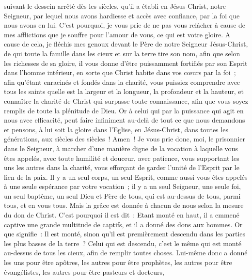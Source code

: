\begin{multicols}{2}
suivant le dessein arrêté dès les siècles, qu'il a établi en Jésus-Christ, notre Seigneur,
par lequel nous avons hardiesse et accès avec confiance, par la foi que nous avons en lui.
C'est pourquoi, je vous prie de ne pas vous relâcher à cause de mes afflictions que je souffre pour l'amour de vous, ce qui est votre gloire.
A cause de cela, je fléchis mes genoux devant le Père de notre Seigneur Jésus-Christ,
de qui toute la famille dans les cieux et sur la terre tire son nom,
afin que selon les richesses de sa gloire, il vous donne d'être puissamment fortifiés par son Esprit dans l'homme intérieur,
en sorte que Christ habite dans vos cœurs par la foi~; afin qu'étant enracinés et fondés dans la charité,
vous puissiez comprendre avec tous les saints quelle est la largeur et la longueur, la profondeur et la hauteur,
et connaître la charité de Christ qui surpasse toute connaissance, afin que vous soyez remplis de toute la plénitude de Dieu.
Or à celui qui par la puissance qui agit en nous avec efficacité, peut faire infiniment au-delà de tout ce que nous demandons et pensons,
à lui soit la gloire dans l'Eglise, en Jésus-Christ, dans toutes les générations, aux siècles des siècles~! Amen~!
\VerseOne{}Je vous prie donc, moi, le prisonnier dans le Seigneur, à marcher d'une manière digne de la vocation à laquelle vous êtes appelés,
avec toute humilité et douceur, avec patience, vous supportant les uns les autres dans la charité,
vous efforçant de garder l'unité de l'Esprit par le lien de la paix.
Il y a un seul corps, un seul Esprit, comme aussi vous êtes appelés à une seule espérance par votre vocation~;
il y a un seul Seigneur, une seule foi, un seul baptême,
un seul Dieu et Père de tous, qui est au-dessus de tous, parmi tous, et en vous tous.
Mais la grâce est donnée à chacun de nous selon la mesure du don de Christ.
C'est pourquoi il est dit~: Etant monté en haut, il a emmené captive une grande multitude de captifs, et il a donné des dons aux hommes.
Or que signifie~: Il est monté, sinon qu'il est premièrement descendu dans les parties les plus basses de la terre~?
Celui qui est descendu, c'est le même qui est monté au-dessus de tous les cieux, afin de remplir toutes choses.
Lui-même donc a donné les uns pour être apôtres, les autres pour être prophètes, les autres pour être évangélistes, les autres pour être pasteurs et docteurs,

\end{multicols}
